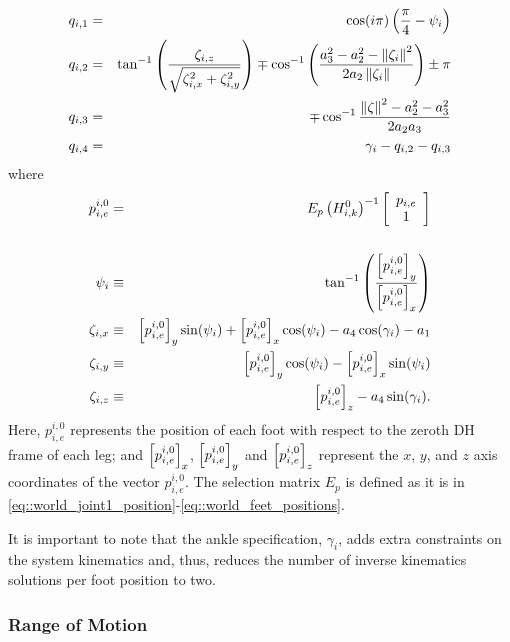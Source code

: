 				\begin{eqnarray}
					q_{i,1} &=& \cos(i\pi) \left( \frac{\pi}{4} - \psi_{i} \right) \nonumber\\
					q_{i,2} &=&	\tan^{-1} \left(\frac{\zeta_{i,z}}{\sqrt{\zeta_{i,x}^2+\zeta_{i,y}^2}}\right) \mp \cos^{-1}\left(\frac{a_{3}^2-a_{2}^2-\left\lVert\zeta_{i}\right\rVert^2}{2 a_{2} \left\lVert\zeta_{i}\right\rVert }\right) \pm \pi 	\nonumber\\
					q_{i,3} &=&	\mp \cos^{-1}\frac{\left\lVert\zeta\right\rVert^2-a_{2}^2-a_{3}^2}{2 a_{2} a_{3}} \nonumber\\
					q_{i,4} &=&	\gamma_{i} - q_{i,2} - q_{i,3}	
				\end{eqnarray}
				where
				\begin{eqnarray}
					{p}_{i,e}^{i,0} &=&
					E_{p} 
					\left( {H}_{i,k}^{0} \right) ^{-1}
					\left[
						\begin{array}{c}
							{p}_{i,e} 		\\
							1 				\\ 	
						\end{array}
					\right]	\nonumber\\																						\nonumber\\
					\psi_{i} 	&\equiv&	\tan^{-1}\left( \frac{\left[{p}_{i,e}^{i,0}\right]_{y}}{\left[{p}_{i,e}^{i,0}\right]_{x} } \right)												\nonumber\\
					\zeta_{i,x} &\equiv& 	\left[{p}_{i,e}^{i,0}\right]_{y} \sin(\psi_{i}) + \left[{p}_{i,e}^{i,0}\right]_{x} \cos(\psi_{i}) - a_{4} \cos(\gamma_{i}) - a_{1} 						\nonumber\\
					\zeta_{i,y} &\equiv& 	\left[{p}_{i,e}^{i,0}\right]_{y} \cos(\psi_{i}) - \left[{p}_{i,e}^{i,0}\right]_{x} \sin(\psi_{i}) 											\nonumber\\
					\zeta_{i,z}	&\equiv&  	\left[{p}_{i,e}^{i,0}\right]_{z} - a_{4} \sin(\gamma_{i}) .
				\end{eqnarray}
			Here, ${p}_{i,e}^{i,0}$ represents the position of each \Ith foot with respect to the zeroth DH frame of each \Ith leg; and $\left[{p}_{i,e}^{i,0}\right]_{x}$, $\left[{p}_{i,e}^{i,0}\right]_{y}$ and $\left[{p}_{i,e}^{i,0}\right]_{z}$ represent the $x$, $y$, and $z$ axis coordinates of the vector ${p}_{i,e}^{i,0}$. The selection matrix $E_{p}$ is defined as it is in \ref{eq::world_joint1_position}-\ref{eq::world_feet_positions}.

			It is important to note that the ankle specification,  $\gamma_{i}$, adds extra constraints on the system kinematics and, thus, reduces the number of inverse kinematics solutions per foot position to two.


		\subsubsection{Range of Motion}

